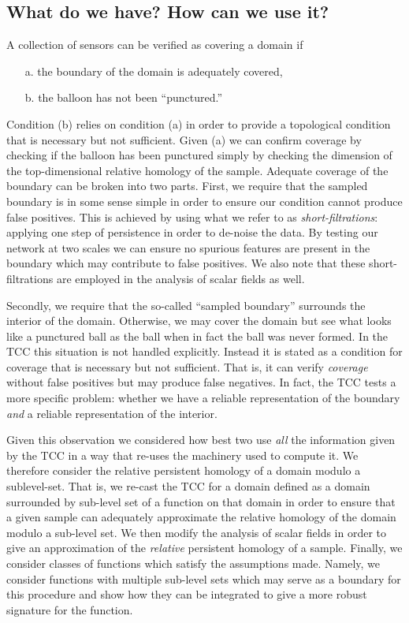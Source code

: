 
\subsection{What do we have? How can we use it?}

A collection of sensors can be verified as covering a domain if
\begin{enumerate}
    \item[a.] the boundary of the domain is adequately covered,
    \item[b.] the balloon has not been ``punctured.''
\end{enumerate}
Condition (b) relies on condition (a) in order to provide a topological condition that is necessary but not sufficient.
Given (a) we can confirm coverage by checking if the balloon has been punctured simply by checking the dimension of the top-dimensional relative homology of the sample.
Adequate coverage of the boundary can be broken into two parts.
First, we require that the sampled boundary is in some sense simple in order to ensure our condition cannot produce false positives.
This is achieved by using what we refer to as \emph{short-filtrations}: applying one step of persistence in order to de-noise the data.
By testing our network at two scales we can ensure no spurious features are present in the boundary which may contribute to false positives.
We also note that these short-filtrations are employed in the analysis of scalar fields as well.

Secondly, we require that the so-called ``sampled boundary'' surrounds the interior of the domain.
Otherwise, we may cover the domain but see what looks like a punctured ball as the ball when in fact the ball was never formed.
In the TCC this situation is not handled explicitly.
Instead it is stated as a condition for coverage that is necessary but not sufficient.
That is, it can verify \emph{coverage} without false positives but may produce false negatives.
In fact, the TCC tests a more specific problem: whether we have a reliable representation of the boundary \emph{and} a reliable representation of the interior.

Given this observation we considered how best two use \emph{all} the information given by the TCC in a way that re-uses the machinery used to compute it.
We therefore consider the relative persistent homology of a domain modulo a sublevel-set.
That is, we re-cast the TCC for a domain defined as a domain surrounded by sub-level set of a function on that domain in order to ensure that a given sample can adequately approximate the relative homology of the domain modulo a sub-level set.
We then modify the analysis of scalar fields in order to give an approximation of the \emph{relative} persistent homology of a sample.
Finally, we consider classes of functions which satisfy the assumptions made.
Namely, we consider functions with multiple sub-level sets which may serve as a boundary for this procedure and show how they can be integrated to give a more robust signature for the function.
